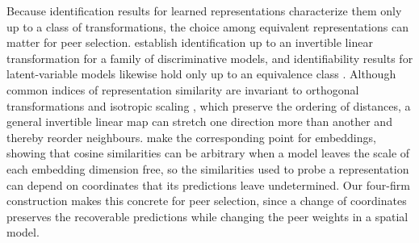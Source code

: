 Because identification results for learned representations characterize
them only up to a class of transformations, the choice among equivalent
representations can matter for peer selection. \citet{roeder2021}
establish identification up to an invertible linear transformation for a
family of discriminative models, and identifiability results for
latent-variable models likewise hold only up to an equivalence class
\citep{khemakhem2020}. Although common indices of representation
similarity are invariant to orthogonal transformations and isotropic
scaling \citep{kornblith2019}, which preserve the ordering of distances, a
general invertible linear map can stretch one direction more than another
and thereby reorder neighbours. \citet{steck2024} make the corresponding
point for embeddings, showing that cosine similarities can be arbitrary
when a model leaves the scale of each embedding dimension free, so the
similarities used to probe a representation can depend on coordinates
that its predictions leave undetermined. Our four-firm construction makes
this concrete for peer selection, since a change of coordinates preserves the
recoverable predictions while changing the peer weights in a spatial model.
